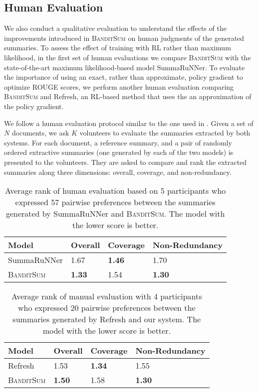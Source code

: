 \documentclass[11pt,a4paper]{article}
\newcommand{\B}{\textsc{BanditSum }}
\begin{document}
\subsection{Human Evaluation}
We also conduct a qualitative evaluation to understand the effects of the improvements introduced in \B on human judgments of the generated summaries. To assess the effect of training with RL rather than maximum likelihood, in the first set of human evaluations we compare \B with the state-of-the-art maximum likelihood-based model SummaRuNNer. To evaluate the importance of using an exact, rather than approximate, policy gradient to optimize ROUGE scores, we perform another human evaluation comparing \B and Refresh, an RL-based method that uses the an approximation of the policy gradient.

We follow a human evaluation protocol similar to the one used in \citet{DBLP:conf/aaai/WuH18}. Given a set of $N$ documents, we ask $K$ volunteers to evaluate the summaries extracted by both systems. For each document, a reference summary, and a pair of randomly ordered extractive summaries (one generated by each of the two models) is presented to the volunteers. They are asked to compare and rank the extracted summaries along three dimensions: overall, coverage, and non-redundancy.

\begin{table}[h!]
\small
\begin{center}
\begin{tabularx}{\columnwidth}{|l|X|X|X|}
\hline
Model & Overall & Coverage & Non-Redundancy \\ \hline
SummaRuNNer & 1.67 &\textbf{1.46}  &1.70  \\ \hline
\B & \textbf{1.33} & 1.54 & \textbf{1.30} \\ \hline
\end{tabularx}
\end{center}
\caption{Average rank of human evaluation based on 5 participants who expressed 57 pairwise preferences between the summaries generated by SummaRuNNer and \textsc{BanditSum}. The model with the lower score is better.}
\label{table:human_eval_summarunner}
\end{table}

\begin{table}[h!]
\small
\begin{center}
\begin{tabularx}{\columnwidth}{|l|X|X|X|}
\hline
Model & Overall & Coverage & Non-Redundancy \\ \hline
Refresh & 1.53 &\textbf{1.34}  & 1.55  \\ \hline
\B & \textbf{1.50} & 1.58 & \textbf{1.30} \\ \hline
\end{tabularx}
\end{center}
\caption{Average rank of manual evaluation with 4 participants who expressed 20 pairwise preferences between the summaries generated by Refresh and our system. The model with the lower score is better.}
\label{table:human_eval_refresh}
\end{table}
\end{document}
